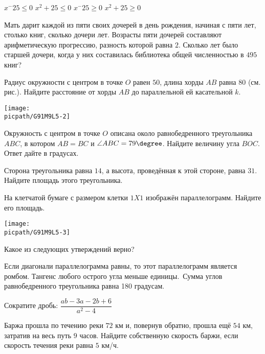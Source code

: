 \begin{class}[number=5]
\begin{listofex}
\begin{tasks}
			\task \( x^-25\le0 \)
			\task \( x^2+25\le0 \)
			\task\( x^-25\ge0 \)
			\task \( x^2+25\ge0 \)
		\end{tasks}
		\item Мать дарит каждой из пяти своих дочерей в день рождения, начиная с пяти лет, столько книг, сколько дочери лет. Возрасты пяти дочерей составляют арифметическую прогрессию, разность которой равна \( 2 \). Сколько лет было старшей дочери, когда у них составилась библиотека общей численностью в \( 495 \) книг?
		\item 
		\begin{minipage}[t]{\bodywidth}
			Радиус окружности с центром в точке \( O \) равен \( 50 \), длина хорды	\( AB \) равна \( 80 \) (см. рис.). Найдите расстояние от хорды \( AB \) до параллельной ей касательной \( k \).
		\end{minipage}
		\gapwidth
		\begin{minipage}[t]{\picwidth}
			\texttt{[image: \\picpath/G91M9L5-2]}
		\end{minipage}
		\item Окружность с центром в точке \( O \) описана около равнобедренного треугольника \( ABC \), в котором \( AB=BC \) и \( \angle ABC=79\degree \). Найдите величину угла \( BOC	 \). Ответ дайте в градусах.
		\item Сторона треугольника равна \( 14 \), а высота, проведённая к этой стороне, равна \( 31 \). Найдите площадь этого треугольника.
		\item
		\begin{minipage}[t]{\bodywidth}
			На клетчатой бумаге с размером клетки \( 1X1 \) изображён параллелограмм. Найдите его площадь.
		\end{minipage}
		\gapwidth
		\begin{minipage}[t]{\picwidth}
			\texttt{[image: \\picpath/G91M9L5-3]}
		\end{minipage}
		\item Какое из следующих утверждений верно?
		\begin{tasks}
			\task Если диагонали параллелограмма равны, то этот параллелограмм является ромбом.
			\task Тангенс любого острого угла меньше единицы.
			\task Сумма углов равнобедренного треугольника равна 180 градусам.
		\end{tasks}
		\item Сократите дробь: \( \dfrac{ab-3a-2b+6}{a^2-4} \)
		\item Баржа прошла по течению реки \( 72 \) км и, повернув обратно, прошла ещё \( 54 \) км, затратив на	весь путь \( 9 \) часов. Найдите собственную скорость баржи, если скорость течения реки равна \( 5 \) км/ч.

\end{listofex}
\end{class}
